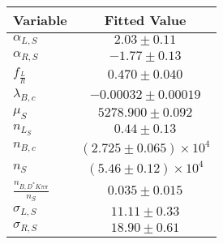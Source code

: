 \begin{tabular}[t]{lc}
\hline
Variable &Fitted Value\\
\hline\hline
$\alpha_{L, S}$&$2.03\pm0.11$\\
\hline
$\alpha_{R, S}$&$-1.77\pm0.13$\\
\hline
$f_{\frac{L}{R}}$&$0.470\pm0.040$\\
\hline
$\lambda_{B,c}$&$-0.00032\pm0.00019$\\
\hline
$\mu_S$&$5278.900\pm0.092$\\
\hline
$n_{L_S}$&$0.44\pm0.13$\\
\hline
$n_{B,c}$&$(2.725\pm0.065)\times 10^4$\\
\hline
$n_S$&$(5.46\pm0.12)\times 10^4$\\
\hline
$\frac{n_{B,D^*K\pi\pi}}{n_S}$&$0.035\pm0.015$\\
\hline
$\sigma_{L, S}$&$11.11\pm0.33$\\
\hline
$\sigma_{R, S}$&$18.90\pm0.61$\\
\hline
\end{tabular}
